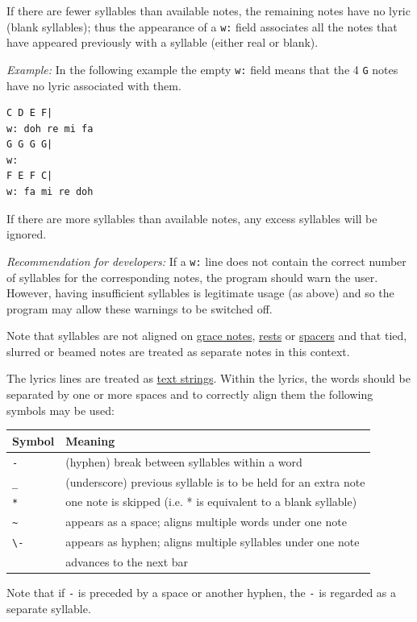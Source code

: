 \documentclass[oneside]{book}
\begin{document}
If there are fewer syllables than available notes, the remaining notes
have no lyric (blank syllables); thus the appearance of a \texttt{w:}
field associates all the notes that have appeared previously with a
syllable (either real or blank).

\emph{Example:} In the following example the empty \texttt{w:} field
means that the 4 \texttt{G} notes have no lyric associated with them.

\begin{verbatim}
C D E F|
w: doh re mi fa
G G G G|
w:
F E F C|
w: fa mi re doh
\end{verbatim}

If there are more syllables than available notes, any excess syllables
will be ignored.

\emph{Recommendation for developers:} If a \texttt{w:} line does not
contain the correct number of syllables for the corresponding notes, the
program should warn the user. However, having insufficient syllables is
legitimate usage (as above) and so the program may allow these warnings
to be switched off.

Note that syllables are not aligned on
\protect\hyperlink{grace_notes}{grace notes},
\protect\hyperlink{rests}{rests} or
\protect\hyperlink{typesetting_extra_space}{spacers} and that tied,
slurred or beamed notes are treated as separate notes in this context.

The lyrics lines are treated as
\protect\hyperlink{text_string_definition}{text strings}. Within the
lyrics, the words should be separated by one or more spaces and to
correctly align them the following symbols may be used:

\begin{longtable}[]{@{}ll@{}}
\toprule
\textbf{Symbol} & \textbf{Meaning}\tabularnewline
\midrule
\endhead
\texttt{-} & (hyphen) break between syllables within a
word\tabularnewline
\texttt{\_} & (underscore) previous syllable is to be held for an extra
note\tabularnewline
\texttt{*} & one note is skipped (i.e. * is equivalent to a blank
syllable)\tabularnewline
\texttt{\textasciitilde{}} & appears as a space; aligns multiple words
under one note\tabularnewline
\texttt{\textbackslash{}-} & appears as hyphen; aligns multiple
syllables under one note\tabularnewline
\texttt{\textbar{}} & advances to the next bar\tabularnewline
\bottomrule
\end{longtable}

Note that if \texttt{-} is preceded by a space or another hyphen, the
\texttt{-} is regarded as a separate syllable.
\end{document}
